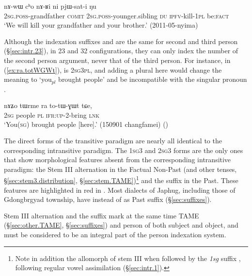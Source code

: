 \begin{exe}
\ex   \label{ex:ni.pjWsati}
\gll   nɤ-wɯ cʰo nɤ-ʁi ni pjɯ-sat-i ŋu \\
\textsc{2sg}.\textsc{poss}-grandfather \textsc{comit} \textsc{2sg}.\textsc{poss}-younger.sibling \textsc{du} \textsc{ipfv}-kill-\textsc{1pl} be:\textsc{fact} \\
\glt `We will kill your grandfather and your brother.' (2011-05-nyima)
\end{exe}

Although the indexation suffixes  and  are the same for second and third person (§\ref{sec:intr.23}), in 2\fl{}3 and 3\fl{}2 configurations, they can only index the number of the second person argument, never that of the third person. For instance, in (\ref{ex:ra.totWGWt}),  is \textsc{2sg}\fl{}\textsc{3pl}, and adding a plural  here would change the meaning to `you$_{pl}$ brought people' and be incompatible with the singular pronoun .

\begin{exe}
\ex   \label{ex:ra.totWGWt}
\gll    nɤʑo tɯrme ra to-tɯ-ɣɯt tɕe, \\
\textsc{2sg} people \textsc{pl} \textsc{ifr}:\textsc{up}-2-bring \textsc{lnk} \\
\glt `You(\textsc{sg}) brought people [here].' (150901 changfamei)
()
\end{exe}

The direct forms of the transitive paradigm are nearly all identical to the corresponding intransitive paradigm. The \textsc{1sg}\fl{}3 and \textsc{2sg}{}\fl{}3 forms are the only ones that show morphological features absent from the corresponding intransitive paradigm: the Stem III alternation in the Factual Non-Past (and other tenses, §\ref{sec:stem3.distribution}, §\ref{sec:stem.TAME})\footnote{Note in addition the allomorph  of stem III when followed by the \textit{1sg} suffix , following regular vowel assimilation (§\ref{sec:intr.1}). 
} and the  suffix in the Past. These features are highlighted in red in . Most dialects of Japhug, including those of Gdongbrgyad township, have  instead of  as Past suffix (§\ref{sec:suffixes}).

Stem III alternation and the  suffix mark at the same time TAME (§\ref{sec:other.TAME}, §\ref{sec:suffixes}) and person of both subject and object, and must be considered to be an integral part of the person indexation system.

